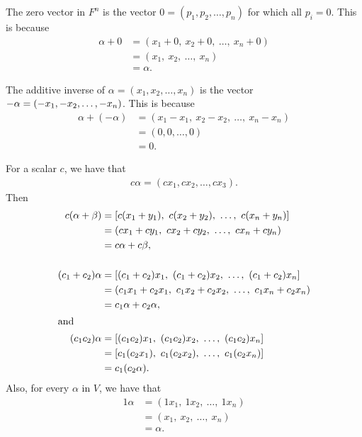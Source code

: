 \documentclass[12pt]{article}
\begin{document}
\begin{enumerate}
    The zero vector in $F^{n}$ is the vector $0 =
    (p_1,p_2,\ldots,p_n)$ for which all $p_i = 0$. This is
    because
    \begin{align*}
      \alpha + 0 &= (x_1+0,\ x_2+0,\ \ldots,\ x_n+0)\\
                 &= (x_1,\ x_2,\ \ldots,\ x_n)\\
                 &= \alpha.
    \end{align*}

    The additive inverse of $\alpha = (x_1,x_2,\ldots,x_n)$ is
    the vector $-\alpha =\\ (-x_1,-x_2,\ldots,-x_n)$. This is
    because
    \begin{align*}
      \alpha + (-\alpha) &= (x_1-x_1,\ x_2-x_2,\ \ldots,\ x_n-x_n)\\
                         &= (0,0,\ldots,0)\\
                         &= 0.
    \end{align*}

    For a scalar $c$, we have that
    \begin{align*}
      c\alpha = (cx_1,cx_2,\ldots,cx_3).
    \end{align*}
    Then
    \begin{align*}
      c(\alpha + \beta) &= [c(x_1+y_1),\ c(x_2+y_2),\ \ldots,\ c(x_n+y_n)]\\
                        &= (cx_1+cy_1,\ cx_2+cy_2,\ \ldots,\ cx_n+cy_n)\\
                        &= c\alpha + c\beta,\\\\
      (c_1+c_2)\alpha &= [(c_1+c_2)x_1,\ (c_1+c_2)x_2,\ \ldots,\ (c_1+c_2)x_n]\\
                      &= (c_1x_1+c_2x_1,\ c_1x_2+c_2x_2,\ \ldots,\ c_1x_n+c_2x_n)\\
                      &= c_1\alpha + c_2\alpha,\\
      \shortintertext{and}
      (c_1c_2)\alpha &= [(c_1c_2)x_1,\ (c_1c_2)x_2,\ \ldots,\ (c_1c_2)x_n]\\
                     &= [c_1(c_2x_1),\ c_1(c_2x_2),\ \ldots,\ c_1(c_2x_n)]\\
                     &= c_1(c_2\alpha).
    \end{align*}
    Also, for every $\alpha$ in $V$, we have that
    \begin{align*}
      1\alpha &= (1x_1,\ 1x_2,\ \ldots,\ 1x_n)\\
              &= (x_1,\ x_2,\ \ldots,\ x_n)\\
              &= \alpha.
    \end{align*}


\end{enumerate}
\end{document}
